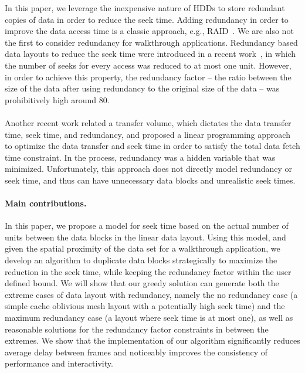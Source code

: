 
In this paper, we leverage the inexpensive nature of HDDs to store redundant
copies of data in order to reduce the seek time. Adding redundancy in order to
improve the data access time is a classic approach, e.g.,
RAID~\cite{Patterson88}.  We are also not the first to consider redundancy for
walkthrough applications.  Redundancy based data layouts to reduce the seek
time were introduced in a recent work~\cite{singleseeklayout}, in which the
number of seeks for every access was reduced to at most one unit. However, in
order to achieve this property, the redundancy factor -- the ratio between the
size of the data after using redundancy to the original size of the data -- was
prohibitively high around 80. \\
\\
Another recent work \cite{optimizingredundancy}
related a transfer volume, which dictates the data transfer time, seek time,
and redundancy, and proposed a linear programming approach to optimize the data
transfer and seek time in order to satisfy the total data fetch time
constraint. In the process, redundancy was a hidden variable that was
minimized. Unfortunately, this approach does not directly model redundancy or
seek time, and thus can have unnecessary data blocks and unrealistic seek
times. 

\paragraph{Main contributions.}
In this paper, we propose a model for seek time based on the actual
number of units
between the data blocks in the linear data layout. Using this model, and given
the spatial proximity of the data set for a walkthrough application, we develop
an algorithm to duplicate data blocks strategically to maximize the reduction
in the seek time, while keeping the redundancy factor within the user defined
bound. We will show that our greedy solution can generate both the extreme cases
of data layout with redundancy, namely the no redundancy case (a simple cache
oblivious mesh layout with a potentially high seek time) and the maximum redundancy case
(a layout where seek time is at most one), as well as reasonable solutions for
the redundancy factor constraints in between the extremes. We show that the
implementation of our algorithm significantly reduces average delay between
frames and noticeably improves the consistency of performance and
interactivity.

